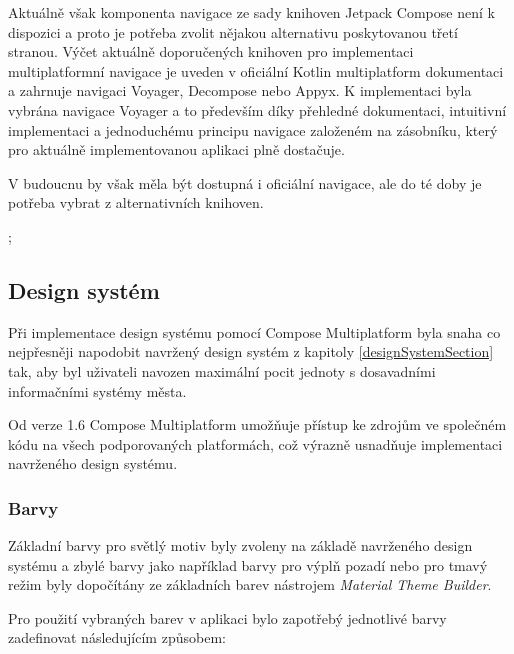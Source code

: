 Aktuálně však komponenta navigace ze sady knihoven Jetpack Compose není k dispozici a proto je potřeba zvolit nějakou alternativu poskytovanou
třetí stranou. \cite{composeNav} Výčet aktuálně doporučených knihoven pro implementaci multiplatformní navigace je uveden v oficiální Kotlin 
multiplatform dokumentaci a zahrnuje navigaci Voyager, Decompose nebo Appyx. K implementaci byla vybrána navigace Voyager a 
to především díky přehledné dokumentaci, intuitivní implementaci a jednoduchému principu navigace založeném na zásobníku, který pro aktuálně
implementovanou aplikaci plně dostačuje.

V budoucnu by však měla být dostupná i oficiální navigace, ale do té doby je potřeba vybrat z alternativních knihoven.


;
\subsection{Design systém} \label{designSystemImpl}

Při implementace design systému pomocí Compose Multiplatform byla snaha co nejpřesněji napodobit navržený design systém z kapitoly \ref{designSystemSection}
tak, aby byl uživateli navozen maximální pocit jednoty s dosavadními informačními systémy města.

Od verze 1.6 Compose Multiplatform umožňuje přístup ke zdrojům ve společném kódu na všech podporovaných platformách, což výrazně usnadňuje 
implementaci navrženého design systému. 



\subsubsection*{Barvy} \label{colorSection}
Základní barvy pro světlý motiv byly zvoleny na základě navrženého design systému
a zbylé barvy jako například barvy pro výplň pozadí nebo pro tmavý režim byly dopočítány ze základních barev nástrojem \textit{Material Theme Builder}.

Pro použití vybraných barev v aplikaci bylo zapotřebý jednotlivé barvy zadefinovat následujícím způsobem:

